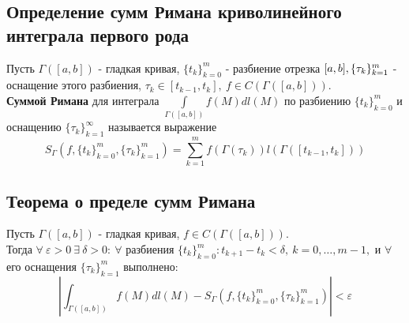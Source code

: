 \documentclass[main]{subfiles}
\begin{document}
\subsection{Определение сумм Римана криволинейного интеграла первого рода}
Пусть $\Gamma([a,b])$ - гладкая кривая, $\{ t_k\}^m_{k=0}$ - разбиение отрезка $[a,b],\\ \{\tau_k\}^m_{k=1}$ - оснащение этого разбиения, $\tau_k\in[t_{k-1},t_k],\ f\in C(\Gamma([a,b])).$ \\\textbf{Суммой Римана} для интеграла $\int\limits_{\Gamma([a,b])} f(M)dl(M)$ по разбиению $\{ t_k\}_{k=0}^m$   и оснащению $\{\tau_k\}_{k=1}^\infty$ называется выражение 
\[ S_\Gamma (f,\{t_k\}^m_{k=0},\{\tau_k\}^m_{k=1})=\sum\limits_{k=1}^m f(\Gamma(\tau_k))l(\Gamma([t_{k-1},t_k]))\tag{27} \]
\subsection{Теорема о пределе сумм Римана}
Пусть $\Gamma([a,b])$ - гладкая кривая, $f\in C(\Gamma([a,b]))$.\\
Тогда $\forall\ \varepsilon>0\ \exists\ \delta>0:\ \forall $ разбиения $\{t_k\}^m_{k=0}: t_{k+1}-t_k<\delta,\ k=0,\dots,m-1,$ и $\forall$ его оснащения $\{\tau_k\}^m_{k=1}$ выполнено:
\[ |\int_{\Gamma([a,b])} f(M)dl(M)-S_\Gamma(f,\{t_k\}^m_{k=0},\{\tau_k\}^m_{k=1})|<\varepsilon\tag{28} \]
\end{document}
